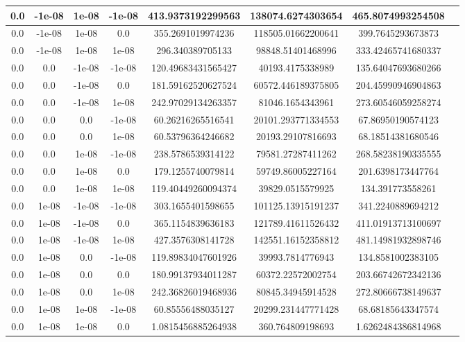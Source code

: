 \documentclass[a4paper]{article}
\begin{document}
\begin{center}
\begin{longtable}{@{}c|@{}c|@{}c|@{}c|@{}c|@{}c|@{}cX@{}}
        0.0 &-1e-08 & 1e-08 & -1e-08 & 413.9373192299563 & 138074.6274303654 & 465.8074993254508\\ \hline
        0.0 &-1e-08 & 1e-08 & 0.0 & 355.2691019974236 & 118505.01662200641 & 399.7645293673873\\ \hline
        0.0 &-1e-08 & 1e-08 & 1e-08 & 296.340389705133 & 98848.51401468996 & 333.42465741680337\\ \hline
        0.0 &0.0 &-1e-08 & -1e-08 & 120.49683431565427 & 40193.4175338989 & 135.64047693680266\\ \hline
        0.0 &0.0 &-1e-08 & 0.0 & 181.59162520627524 & 60572.446189375805 & 204.45990946904863\\ \hline
        0.0 &0.0 &-1e-08 & 1e-08 & 242.97029134263357 & 81046.1654343961 & 273.60546059258274\\ \hline
        0.0 &0.0 &0.0 &-1e-08 & 60.26216265516541 & 20101.293771334553 & 67.86950190574123\\ \hline
        0.0 &0.0 &0.0 &1e-08 & 60.53796364246682 & 20193.29107816693 & 68.18514381680546\\ \hline
        0.0 &0.0 &1e-08 & -1e-08 & 238.5786539314122 & 79581.27287411262 & 268.58238190335555\\ \hline
        0.0 &0.0 &1e-08 & 0.0 & 179.1255740079814 & 59749.86005227164 & 201.6398173447764\\ \hline
        0.0 &0.0 &1e-08 & 1e-08 & 119.40449260094374 & 39829.0515579925 & 134.391773558261\\ \hline
        0.0 &1e-08 & -1e-08 & -1e-08 & 303.1655401598655 & 101125.13915191237 & 341.2240889694212\\ \hline
        0.0 &1e-08 & -1e-08 & 0.0 & 365.1154839636183 & 121789.41611526432 & 411.01913713100697\\ \hline
        0.0 &1e-08 & -1e-08 & 1e-08 & 427.3576308141728 & 142551.16152358812 & 481.14981932898746\\ \hline
        0.0 &1e-08 & 0.0 &-1e-08 & 119.89834047601926 & 39993.7814776943 & 134.8581002383105\\ \hline
        0.0 &1e-08 & 0.0 &0.0 & 180.99137934011287 & 60372.22572002754 & 203.66742672342136\\ \hline
        0.0 &1e-08 & 0.0 &1e-08 & 242.36826019468936 & 80845.34945914528 & 272.80666738149637\\ \hline
        0.0 &1e-08 & 1e-08 & -1e-08 & 60.85556488035127 & 20299.231447771428 & 68.68185643347574\\ \hline
        0.0 &1e-08 & 1e-08 & 0.0 & 1.0815456885264938 & 360.764809198693 & 1.6262484386814968\\ \hline

\end{longtable}
\end{center}
\end{document}
